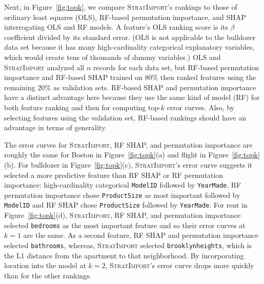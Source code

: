 \documentclass[11pt]{article}
\newcommand{\figref}[1]{Figure~\ref{#1}}
\newcommand{\simpo}{\fontfamily{cmr}\textsc{\small StratImport}}
\begin{document}
Next, in \figref{fig:topk}, we compare \simpo{}'s rankings to those of ordinary least squares (OLS), RF-based permutation importance, and SHAP interrogating OLS and RF models. A feature's OLS ranking score is its $\beta$ coefficient divided by its standard error. (OLS is not applicable to the bulldozer data set because it has many high-cardinality categorical explanatory variables, which would create tens of thousands of dummy variables.) OLS and \simpo{} analyzed all $n$ records for each data set, but RF-based permutation importance and RF-based SHAP trained on 80\% then ranked features using the remaining 20\% as validation sets. RF-based SHAP and permutation importance have a distinct advantage here because they use the same kind of model (RF) for both feature ranking and then for computing top-$k$ error curves. Also, by selecting features using the validation set, RF-based rankings should have an advantage in terms of generality. 

The error curves for \simpo, RF SHAP, and permutation importance are roughly the same for Boston in \figref{fig:topk}(a) and flight in \figref{fig:topk}(b). For bulldozer in \figref{fig:topk}(c), \simpo's error curve suggests it selected a more predictive feature than RF SHAP or RF permutation importance: high-cardinality categorical {\tt ModelID}  followed by {\tt YearMade}. RF permutation importance chose {\tt ProductSize} as most important followed by {\tt ModelID} and RF SHAP chose {\tt ProductSize} followed by {\tt YearMade}. For rent in \figref{fig:topk}(d), \simpo, RF SHAP, and permutation importance selected {\tt bedrooms} as the most important feature and so their error curves at $k=1$ are the same. As a second feature, RF SHAP and permutation importance selected {\tt bathrooms}, whereas, \simpo{} selected {\tt brooklynheights}, which is the L1 distance from the apartment to that neighborhood. By incorporating location into the model at $k=2$, \simpo's error curve drops more quickly than for the other rankings. 
\end{document}
